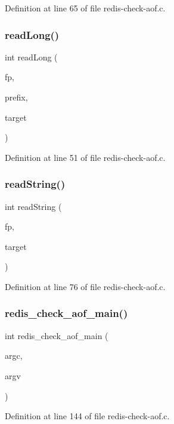 Definition at line 65 of file redis-\/check-\/aof.\+c.

\mbox{\label{redis-check-aof_8c_a25d1a2f4b61372995c5ddaa8719f4778}} 
\subsubsection{\texorpdfstring{read\+Long()}{readLong()}}
{\footnotesize\ttfamily int read\+Long (\begin{DoxyParamCaption}\item[{F\+I\+LE $\ast$}]{fp,  }\item[{char}]{prefix,  }\item[{long $\ast$}]{target }\end{DoxyParamCaption})}



Definition at line 51 of file redis-\/check-\/aof.\+c.

\mbox{\label{redis-check-aof_8c_a5ffcae5a68079488c621f58b7a346e97}} 
\subsubsection{\texorpdfstring{read\+String()}{readString()}}
{\footnotesize\ttfamily int read\+String (\begin{DoxyParamCaption}\item[{F\+I\+LE $\ast$}]{fp,  }\item[{char $\ast$$\ast$}]{target }\end{DoxyParamCaption})}



Definition at line 76 of file redis-\/check-\/aof.\+c.

\mbox{\label{redis-check-aof_8c_a4cf4c173fb3690dd908cd74f72847972}} 
\subsubsection{\texorpdfstring{redis\+\_\+check\+\_\+aof\+\_\+main()}{redis\_check\_aof\_main()}}
{\footnotesize\ttfamily int redis\+\_\+check\+\_\+aof\+\_\+main (\begin{DoxyParamCaption}\item[{int}]{argc,  }\item[{char $\ast$$\ast$}]{argv }\end{DoxyParamCaption})}



Definition at line 144 of file redis-\/check-\/aof.\+c.


